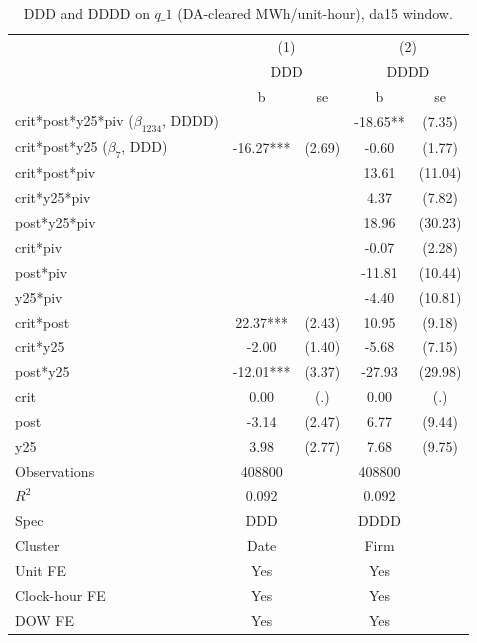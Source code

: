 \begin{table}[htbp]\centering
\def\sym#1{\ifmmode^{#1}\else\(^{#1}\)\fi}
\caption{DDD and DDDD on $q\_1$ (DA-cleared MWh/unit-hour), da15 window.}\label{tab:reform_ddd_firm_q1_da15}
\begin{tabular}{l*{2}{cc}}
\toprule
                    &\multicolumn{2}{c}{(1)}     &\multicolumn{2}{c}{(2)}     \\
                    &\multicolumn{2}{c}{DDD}     &\multicolumn{2}{c}{DDDD}    \\
                    &           b   &          se&           b   &          se\\
\midrule
crit*post*y25*piv ($\beta_{1234}$, DDDD)&               &            &      -18.65** &      (7.35)\\
crit*post*y25 ($\beta_7$, DDD)&      -16.27***&      (2.69)&       -0.60   &      (1.77)\\
crit*post*piv       &               &            &       13.61   &     (11.04)\\
crit*y25*piv        &               &            &        4.37   &      (7.82)\\
post*y25*piv        &               &            &       18.96   &     (30.23)\\
crit*piv            &               &            &       -0.07   &      (2.28)\\
post*piv            &               &            &      -11.81   &     (10.44)\\
y25*piv             &               &            &       -4.40   &     (10.81)\\
crit*post           &       22.37***&      (2.43)&       10.95   &      (9.18)\\
crit*y25            &       -2.00   &      (1.40)&       -5.68   &      (7.15)\\
post*y25            &      -12.01***&      (3.37)&      -27.93   &     (29.98)\\
crit                &        0.00   &         (.)&        0.00   &         (.)\\
post                &       -3.14   &      (2.47)&        6.77   &      (9.44)\\
y25                 &        3.98   &      (2.77)&        7.68   &      (9.75)\\
\midrule
Observations        &      408800   &            &      408800   &            \\
$R^2$               &       0.092   &            &       0.092   &            \\
Spec                &         DDD   &            &        DDDD   &            \\
Cluster             &        Date   &            &        Firm   &            \\
Unit FE             &         Yes   &            &         Yes   &            \\
Clock-hour FE       &         Yes   &            &         Yes   &            \\
DOW FE              &         Yes   &            &         Yes   &            \\
\bottomrule
\end{tabular}
\end{table}
